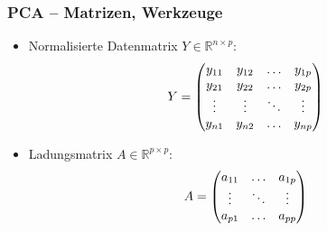 \begin{frame}

\frametitle{PCA -- Matrizen, Werkzeuge}
\begin{itemize}
\setlength{\itemsep}{20pt}
\item Normalisierte Datenmatrix $Y \in \mathbb{R}^{n \times p}$:
\begin{equation}
Y=\begin{pmatrix}
y_{11} & y_{12} & \hdots & y_{1p} \\
y_{21} & y_{22} & \hdots & y_{2p} \\
\vdots & \vdots & \ddots & \vdots \\
y_{n1} & y_{n2} & \hdots & y_{np}
\end{pmatrix} \notag
\end{equation}
\item Ladungsmatrix $A \in \mathbb{R}^{p \times p}$:
\begin{equation}
A=\begin{pmatrix}
a_{11} & \hdots & a_{1p} \\
\vdots & \ddots & \vdots \\
a_{p1} & \hdots & a_{pp}
\end{pmatrix} \notag
\end{equation}
\end{itemize}
\end{frame}








